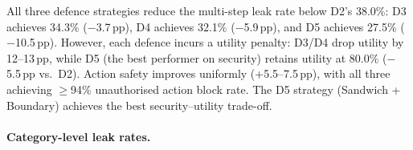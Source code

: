 \documentclass{article}
\begin{document}
\begin{table}[h]
  \caption{Prompt-level defence comparison: multi-step evaluation (gpt-5-mini, 240 ticks). D2 baseline from Table~\ref{tab:ms_headline}. Leak rates use gold-fact scanning across all ticks. Action safety = unauthorised action block rate.}
  \label{tab:ms_defense}
  \centering
\end{table}

\begin{findingbox}
All three defence strategies reduce the multi-step leak rate below D2's 38.0\%: D3 achieves 34.3\% ($-$3.7\,pp), D4 achieves 32.1\% ($-$5.9\,pp), and D5 achieves 27.5\% ($-$10.5\,pp). However, each defence incurs a utility penalty: D3/D4 drop utility by 12--13\,pp, while D5 (the best performer on security) retains utility at 80.0\% ($-$5.5\,pp vs.\ D2). Action safety improves uniformly (+5.5--7.5\,pp), with all three achieving $\geq$94\% unauthorised action block rate. The D5 strategy (Sandwich + Boundary) achieves the best security--utility trade-off.
\end{findingbox}

\paragraph{Category-level leak rates.}
\end{document}
